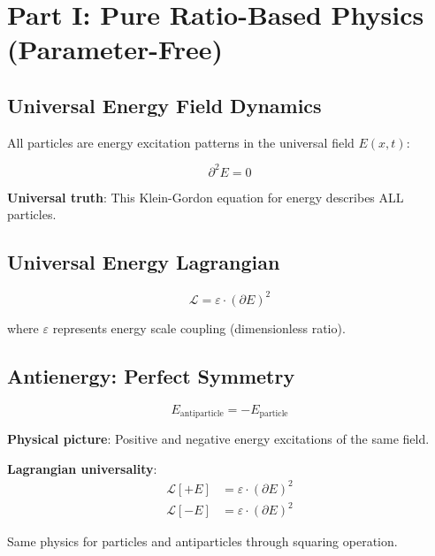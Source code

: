 \documentclass[12pt,a4paper]{article}
\newcommand{\Lag}{\mathcal{L}}
\newcommand{\Efield}{E}
\theoremstyle{definition}
\theoremstyle{remark}
\begin{document}
	\section{Part I: Pure Ratio-Based Physics (Parameter-Free)}
	
	\subsection{Universal Energy Field Dynamics}
	
	All particles are energy excitation patterns in the universal field $\Efield(x,t)$:
	
	\begin{equation}
		\boxed{\partial^2 \Efield = 0}
		\label{eq:universal_field_equation}
	\end{equation}
	
	\textbf{Universal truth}: This Klein-Gordon equation for energy describes ALL particles.
	
	\subsection{Universal Energy Lagrangian}
	
	\begin{equation}
		\boxed{\Lag = \varepsilon \cdot (\partial \Efield)^2}
		\label{eq:universal_lagrangian}
	\end{equation}
	
	where $\varepsilon$ represents energy scale coupling (dimensionless ratio).
	
	\subsection{Antienergy: Perfect Symmetry}
	
	\begin{equation}
		\boxed{\Efield_{\text{antiparticle}} = -\Efield_{\text{particle}}}
		\label{eq:energy_antisymmetry}
	\end{equation}
	
	\textbf{Physical picture}: Positive and negative energy excitations of the same field.
	
	\textbf{Lagrangian universality}:
	\begin{align}
		\Lag[+\Efield] &= \varepsilon \cdot (\partial \Efield)^2 \\
		\Lag[-\Efield] &= \varepsilon \cdot (\partial \Efield)^2
	\end{align}
	
	Same physics for particles and antiparticles through squaring operation.
	
\end{document}
